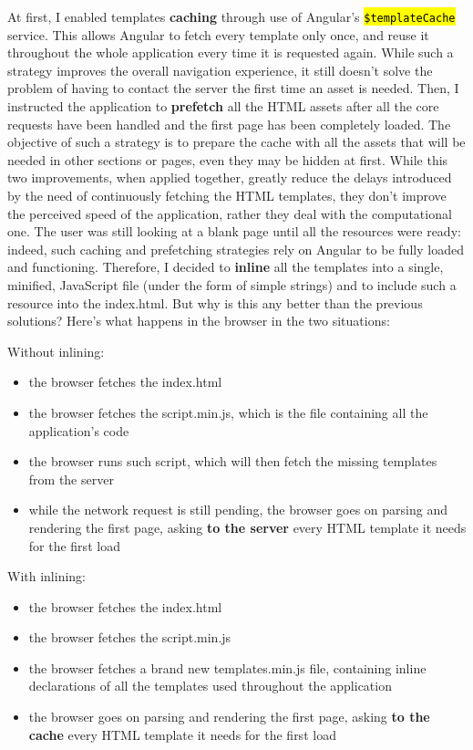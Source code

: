 \documentclass[12pt,svgnames]{memoir}
\let\OldTexttt\texttt
\renewcommand{\texttt}[1]{\OldTexttt{\hl{#1}}}
\begin{document}
At first, I enabled templates \textbf{caching} through use of Angular's
\texttt{\$templateCache} service. This allows Angular to fetch every
template only once, and reuse it throughout the whole application every
time it is requested again. While such a strategy improves the overall
navigation experience, it still doesn't solve the problem of having to
contact the server the first time an asset is needed. Then, I instructed
the application to \textbf{prefetch} all the HTML assets after all the
core requests have been handled and the first page has been completely
loaded. The objective of such a strategy is to prepare the cache with
all the assets that will be needed in other sections or pages, even they
may be hidden at first. While this two improvements, when applied
together, greatly reduce the delays introduced by the need of
continuously fetching the HTML templates, they don't improve the
perceived speed of the application, rather they deal with the
computational one. The user was still looking at a blank page until all
the resources were ready: indeed, such caching and prefetching
strategies rely on Angular to be fully loaded and functioning.
Therefore, I decided to \textbf{inline} all the templates into a single,
minified, JavaScript file (under the form of simple strings) and to
include such a resource into the index.html. But why is this any better
than the previous solutions? Here's what happens in the browser in the
two situations:

Without inlining:

\begin{itemize}
\itemsep1pt\parskip0pt
\item
  the browser fetches the index.html
\item
  the browser fetches the script.min.js, which is the file containing
  all the application's code
\item
  the browser runs such script, which will then fetch the missing
  templates from the server
\item
  while the network request is still pending, the browser goes on
  parsing and rendering the first page, asking \textbf{to the server}
  every HTML template it needs for the first load
\end{itemize}

With inlining:

\begin{itemize}
\itemsep1pt\parskip0pt
\item
  the browser fetches the index.html
\item
  the browser fetches the script.min.js
\item
  the browser fetches a brand new templates.min.js file, containing
  inline declarations of all the templates used throughout the
  application
\item
  the browser goes on parsing and rendering the first page, asking
  \textbf{to the cache} every HTML template it needs for the first load
\end{itemize}
\end{document}
